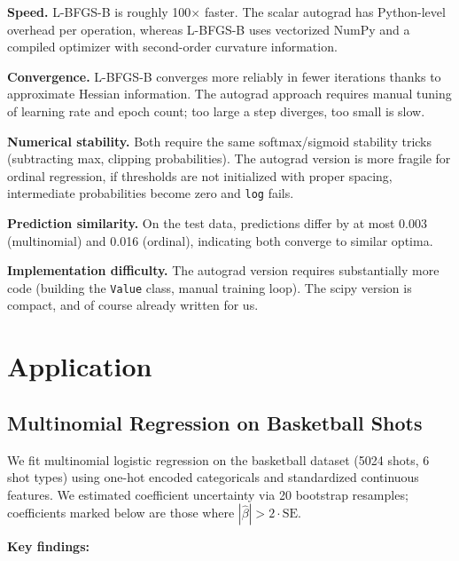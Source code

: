 \documentclass[10pt, a4paper]{article}
\begin{document}
\textbf{Speed.} L-BFGS-B is roughly 100$\times$ faster. The scalar autograd has Python-level overhead per operation, whereas L-BFGS-B uses vectorized NumPy and a compiled optimizer with second-order curvature information.

\textbf{Convergence.} L-BFGS-B converges more reliably in fewer iterations thanks to approximate Hessian information. The autograd approach requires manual tuning of learning rate and epoch count; too large a step diverges, too small is slow.

\textbf{Numerical stability.} Both require the same softmax/sigmoid stability tricks (subtracting max, clipping probabilities). The autograd version is more fragile for ordinal regression, if thresholds are not initialized with proper spacing, intermediate probabilities become zero and \texttt{log} fails.

\textbf{Prediction similarity.} On the test data, predictions differ by at most 0.003 (multinomial) and 0.016 (ordinal), indicating both converge to similar optima.

\textbf{Implementation difficulty.} The autograd version requires substantially more code (building the \texttt{Value} class, manual training loop). The scipy version is compact, and of course already written for us.

\section{Application}

\subsection{Multinomial Regression on Basketball Shots}

We fit multinomial logistic regression on the basketball dataset (5024 shots, 6 shot types) using one-hot encoded categoricals and standardized continuous features. We estimated coefficient uncertainty via 20 bootstrap resamples; coefficients marked below are those where $|\hat{\beta}| > 2 \cdot \text{SE}$.

\textbf{Key findings:}
\end{document}
